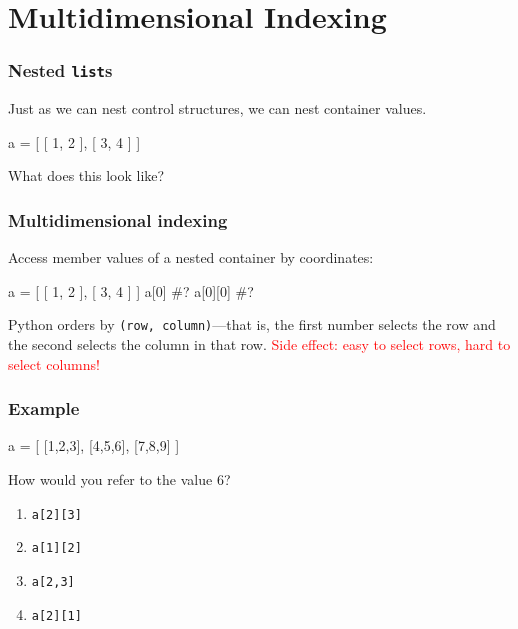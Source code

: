\documentclass[11pt]{beamer}
\begin{document}
\section{Multidimensional Indexing}

\begin{frame}[fragile]
  \frametitle{Nested \texttt{list}s}
  \Enlarge

  \begin{itemize}
  \myitem  Just as we can nest control structures, we can nest container values.
  \end{itemize}
  \begin{semiverbatim}
a = [ [ 1, 2 ], [ 3, 4 ] ]
  \end{semiverbatim}
  \begin{itemize}
  \myitem  What does this look like?
  \end{itemize}
\end{frame}

\begin{frame}[fragile]
  \frametitle{Multidimensional indexing}
  \Enlarge

  \begin{itemize}
  \myitem  Access member values of a nested container by coordinates:
  \end{itemize}
  \begin{semiverbatim}
a = [ [ 1, 2 ], [ 3, 4 ] ]
a[0]    #?
a[0][0] #?
  \end{semiverbatim}
  \myitem  Python orders by \texttt{(row, column)}---that is, the first number selects the row and the second selects the column in that row.
  \myitem  \textcolor{red}{Side effect:  easy to select rows, hard to select columns!}
\end{frame}

\begin{frame}[fragile]
  \frametitle{Example}
  \Enlarge

  \begin{semiverbatim}
a = [ [1,2,3], [4,5,6], [7,8,9] ]
  \end{semiverbatim}
  How would you refer to the value 6?
  \begin{enumerate}[label=\Alph*]
  \item  \texttt{a[2][3]}
  \item  \texttt{a[1][2]}
  \item  \texttt{a[2,3]}
  \item  \texttt{a[2][1]}
  \end{enumerate}
\end{frame}
\end{document}
